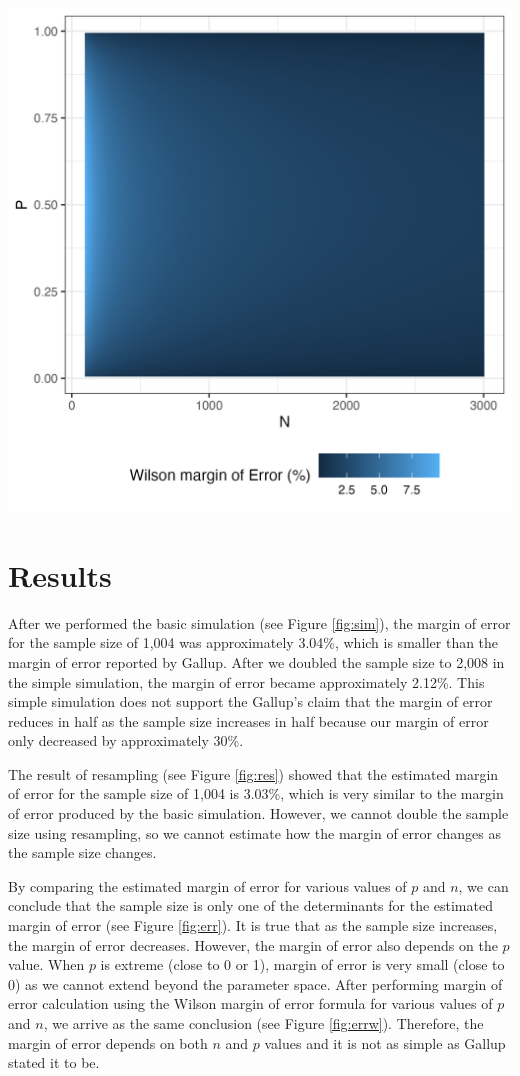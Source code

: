 \documentclass{article}\usepackage[]{graphicx}\usepackage[]{xcolor}
\newenvironment{Figure}
  {\par\medskip\noindent\minipage{\linewidth}}
  {\endminipage\par\medskip}
\begin{document}
\begin{multicols}{2}
\begin{Figure}
 \centering
 \includegraphics[width =0.7\linewidth]{error.wilson.png}
 \label{fig:errw}
\end{Figure}


\section{Results}\label{sec:results}

After we performed the basic simulation (see Figure \ref{fig:sim}), the margin of error for the sample size of 1,004 was approximately 3.04\%, which is smaller than the margin of error reported by Gallup. After we doubled the sample size to 2,008 in the simple simulation, the margin of error became approximately 2.12\%. This simple simulation does not support the Gallup's claim that the margin of error reduces in half as the sample size increases in half because our margin of error only decreased by approximately 30\%. 

The result of resampling (see Figure \ref{fig:res}) showed that the estimated margin of error for the sample size of 1,004 is 3.03\%, which is very similar to the margin of error produced by the basic simulation. However, we cannot double the sample size using resampling, so we cannot estimate how the margin of error changes as the sample size changes.

By comparing the estimated margin of error for various values of $p$ and $n$, we can conclude that the sample size is only one of the determinants for the estimated margin of error (see Figure \ref{fig:err}). It is true that as the sample size increases, the margin of error decreases. However, the margin of error also depends on the $p$ value. When $p$ is extreme (close to 0 or 1), margin of error is very small (close to 0) as we cannot extend beyond the parameter space. After performing margin of error calculation using the Wilson margin of error formula for various values of $p$ and $n$, we arrive as the same conclusion (see Figure \ref{fig:errw}). Therefore, the margin of error depends on both $n$ and $p$ values and it is not as simple as Gallup stated it to be.




\end{multicols}
\end{document}
